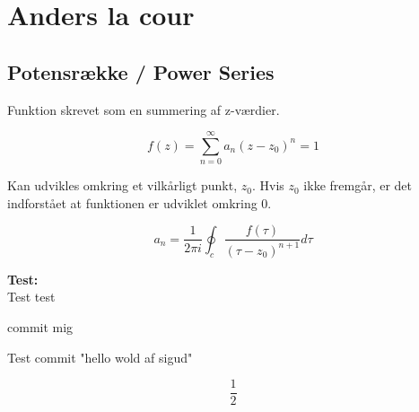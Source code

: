 \chapter{Anders la cour}

\section{Potensrække / Power Series}

Funktion skrevet som en summering af z-værdier. 


\begin{equation*}
       f(z)=\sum_{n=0}^{\infty} a_{n}(z-z_0)^{n} = 1  
\end{equation*}

Kan udvikles omkring et vilkårligt punkt, \(z_0\).
Hvis \(z_0\) ikke fremgår, er det indforstået at funktionen er udviklet omkring 0. 


\begin{equation*}
a_n = \frac{1}{2\pi i} \oint_c \frac{f(\tau)}{(\tau-z_0)^{n+1}} d\tau
\end{equation*}


\begin{tcolorbox}[colback=white!5!white,colframe=blue!75!black]
  \textbf{Test:}\\
Test test

commit mig

\end{tcolorbox}



Test commit "hello wold af sigud"


$$ \frac{1}{2} $$